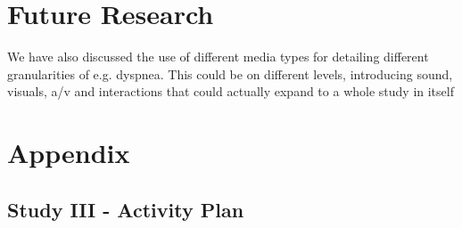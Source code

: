 \chapter{Future Research}
We have also discussed the use of different media types for detailing different granularities of e.g. dyspnea. This could be on different levels, introducing sound, visuals, a/v and interactions that could actually expand to a whole study in itself

\label{lastpage}

\appendix
\chapter{Appendix}
\section{Study III - Activity Plan}
\label{ap3}


\listoffixmes

